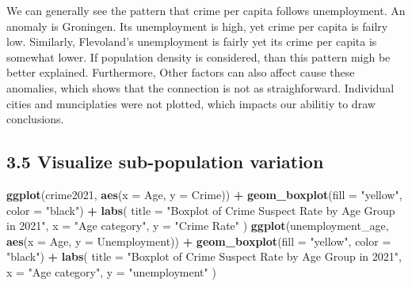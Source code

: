 \documentclass[
]{article}
\newenvironment{Shaded}{\begin{snugshade}}{\end{snugshade}}
\newcommand{\AttributeTok}[1]{\textcolor[rgb]{0.13,0.29,0.53}{#1}}
\newcommand{\FunctionTok}[1]{\textcolor[rgb]{0.13,0.29,0.53}{\textbf{#1}}}
\newcommand{\NormalTok}[1]{#1}
\newcommand{\SpecialCharTok}[1]{\textcolor[rgb]{0.81,0.36,0.00}{\textbf{#1}}}
\newcommand{\StringTok}[1]{\textcolor[rgb]{0.31,0.60,0.02}{#1}}
\begin{document}
We can generally see the pattern that crime per capita follows
unemployment. An anomaly is Groningen. Its unemployment is high, yet
crime per capita is failry low. Similarly, Flevoland's unemployment is
fairly yet its crime per capita is somewhat lower. If population density
is considered, than this pattern migh be better explained. Furthermore,
Other factors can also affect cause these anomalies, which shows that
the connection is not as straighforward. Individual cities and
munciplaties were not plotted, which impacts our abilitiy to draw
conclusions.

\subsection{3.5 Visualize sub-population
variation}\label{visualize-sub-population-variation}

\begin{Shaded}
\begin{Highlighting}[]
\FunctionTok{ggplot}\NormalTok{(crime2021, }\FunctionTok{aes}\NormalTok{(}\AttributeTok{x =}\NormalTok{ Age, }\AttributeTok{y =}\NormalTok{ Crime)) }\SpecialCharTok{+}
  \FunctionTok{geom\_boxplot}\NormalTok{(}\AttributeTok{fill =} \StringTok{"yellow"}\NormalTok{, }\AttributeTok{color =} \StringTok{"black"}\NormalTok{) }\SpecialCharTok{+}
  \FunctionTok{labs}\NormalTok{(}
    \AttributeTok{title =} \StringTok{"Boxplot of Crime Suspect Rate by Age Group in 2021"}\NormalTok{,}
    \AttributeTok{x =} \StringTok{"Age category"}\NormalTok{,}
    \AttributeTok{y =} \StringTok{"Crime Rate"}
\NormalTok{  ) }
\FunctionTok{ggplot}\NormalTok{(unemployment\_age, }\FunctionTok{aes}\NormalTok{(}\AttributeTok{x =}\NormalTok{ Age, }\AttributeTok{y =}\NormalTok{ Unemployment)) }\SpecialCharTok{+}
  \FunctionTok{geom\_boxplot}\NormalTok{(}\AttributeTok{fill =} \StringTok{"yellow"}\NormalTok{, }\AttributeTok{color =} \StringTok{"black"}\NormalTok{) }\SpecialCharTok{+}
  \FunctionTok{labs}\NormalTok{(}
    \AttributeTok{title =} \StringTok{"Boxplot of Crime Suspect Rate by Age Group in 2021"}\NormalTok{,}
    \AttributeTok{x =} \StringTok{"Age category"}\NormalTok{,}
    \AttributeTok{y =} \StringTok{"unemployment"}
\NormalTok{  ) }
\end{Highlighting}
\end{Shaded}
\end{document}
